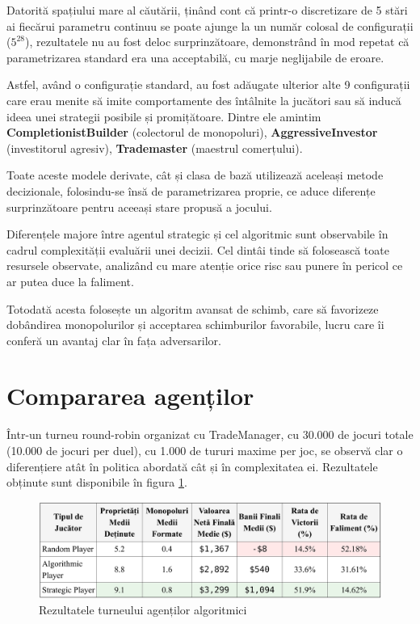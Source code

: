 Datorită spațiului mare al căutării, ținând cont că printr-o discretizare de 5 stări ai fiecărui parametru continuu se poate ajunge la un număr colosal de configurații ($5^{28}$), rezultatele nu au fost deloc surprinzătoare, demonstrând în mod repetat că parametrizarea standard era una acceptabilă, cu marje neglijabile de eroare.

Astfel, având o configurație standard, au fost adăugate ulterior alte 9 configurații care erau menite să imite comportamente des întâlnite la jucători sau să inducă ideea unei strategii posibile și promițătoare. Dintre ele amintim \textbf{CompletionistBuilder} (colectorul de monopoluri), \textbf{AggressiveInvestor} (investitorul agresiv), \textbf{Trademaster} (maestrul comerțului).

Toate aceste modele derivate, cât și clasa de bază utilizează aceleași metode decizionale, folosindu-se însă de parametrizarea proprie, ce aduce diferențe surprinzătoare pentru aceeași stare propusă a jocului.

Diferențele majore între agentul strategic și cel algoritmic sunt observabile în cadrul complexității evaluării unei decizii. Cel dintâi tinde să folosească toate resursele observate, analizând cu mare atenție orice risc sau punere în pericol ce ar putea duce la faliment.

Totodată acesta folosește un algoritm avansat de schimb, care să favorizeze dobândirea monopolurilor și acceptarea schimburilor favorabile, lucru care îi conferă un avantaj clar în fața adversarilor.

\section{Compararea agenților}
Într-un turneu round-robin organizat cu TradeManager, cu 30.000 de jocuri totale (10.000 de jocuri per duel), cu 1.000 de tururi maxime per joc, se observă clar o diferențiere atât în politica abordată cât și în complexitatea ei. Rezultatele obținute sunt disponibile în figura \ref{fig:tournament-results-algorithmic}.

\begin{figure}[H]
    \centering
    \includegraphics[width=16cm]{images/tournament_results_table.png}
    \caption{Rezultatele turneului agenților algoritmici}
    \label{fig:tournament-results-algorithmic}
\end{figure}

